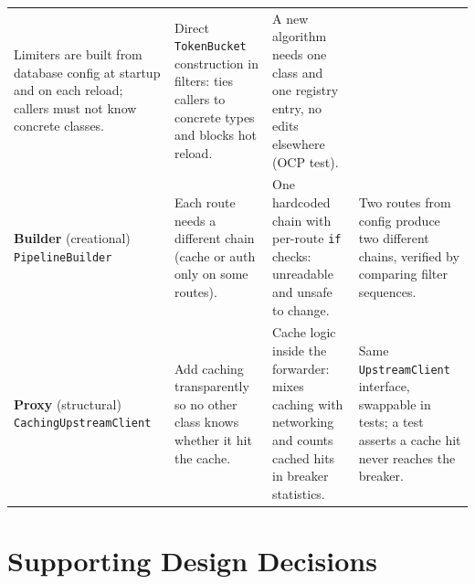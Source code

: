 \documentclass[12pt,a4paper]{article}
\newcommand{\cls}[1]{\nolinkurl{#1}}
\begin{document}
\begin{longtable}{L{2.9cm} L{3.5cm} L{3.5cm} L{3.9cm}}
Limiters are built from database config at startup and on each reload; callers must not know concrete classes. &
Direct \cls{TokenBucket} construction in filters: ties callers to concrete types and blocks hot reload. &
A new algorithm needs one class and one registry entry, no edits elsewhere (OCP test). \\
\textbf{Builder} (creational) \newline \cls{PipelineBuilder} &
Each route needs a different chain (cache or auth only on some routes). &
One hardcoded chain with per-route \cls{if} checks: unreadable and unsafe to change. &
Two routes from config produce two different chains, verified by comparing filter sequences. \\
\textbf{Proxy} (structural) \newline \cls{CachingUpstreamClient} &
Add caching transparently so no other class knows whether it hit the cache. &
Cache logic inside the forwarder: mixes caching with networking and counts cached hits in breaker statistics. &
Same \cls{UpstreamClient} interface, swappable in tests; a test asserts a cache hit never reaches the breaker. \\
\bottomrule
\end{longtable}
\endgroup

\section{Supporting Design Decisions}
\end{document}
